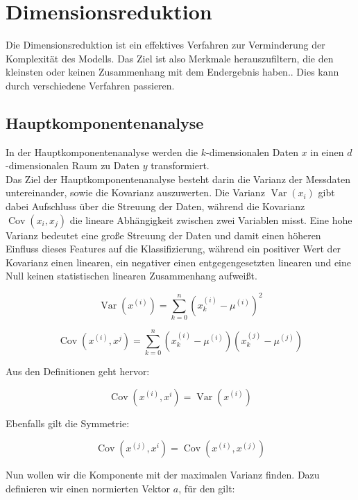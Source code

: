 \documentclass[11pt]{article} %
\DeclareMathOperator{\Var}{Var}
\DeclareMathOperator{\Cov}{Cov}
\begin{document}
\section{Dimensionsreduktion}
Die Dimensionsreduktion ist ein effektives Verfahren zur Verminderung der Komplexität des Modells. Das Ziel ist also Merkmale herauszufiltern, die den kleinsten oder keinen Zusammenhang mit dem Endergebnis haben.. Dies kann durch verschiedene Verfahren passieren. 
\subsection{Hauptkomponentenanalyse}
In der Hauptkomponentenanalyse werden die $k$-dimensionalen Daten $x$ in einen $d$-dimensionalen Raum zu Daten $y$ transformiert. \\
Das Ziel der Hauptkomponentenanalyse besteht darin die Varianz der Messdaten untereinander, sowie die Kovarianz auszuwerten. Die Varianz 
$\Var(x_i)$ gibt dabei Aufschluss über die Streuung der Daten, während die Kovarianz $\Cov(x_i, x_j)$ die lineare Abhängigkeit zwischen zwei Variablen misst. Eine hohe Varianz bedeutet eine große Streuung der Daten und damit einen höheren Einfluss dieses Features auf die Klassifizierung, während ein positiver Wert der Kovarianz einen linearen, ein negativer einen entgegengesetzten linearen und eine Null keinen statistischen linearen Zusammenhang aufweißt.

\begin{equation}
\Var(x^{(i)}) = \sum_{k=0}^n (x_k^{(i)}-\mu^{(i)})^2
\end{equation}

\begin{equation}
\Cov(x^{(i)}, x^{j}) = \sum_{k=0}^n (x_k^{(i)}-\mu^{(i)}) (x_k^{(j)}-\mu^{(j)})
\end{equation}

Aus den Definitionen geht hervor:

\begin{equation}
\Cov(x^{(i)}, x^{i}) = \Var(x^{(i)}) 
\end{equation}

Ebenfalls gilt die Symmetrie:

\begin{equation}
\Cov(x^{(j)}, x^{i}) = \Cov(x^{(i)}, x^{(j)}) 
\end{equation}

Nun wollen wir die Komponente mit der maximalen Varianz finden. Dazu definieren wir einen normierten Vektor $a$, für den gilt:
\end{document}
